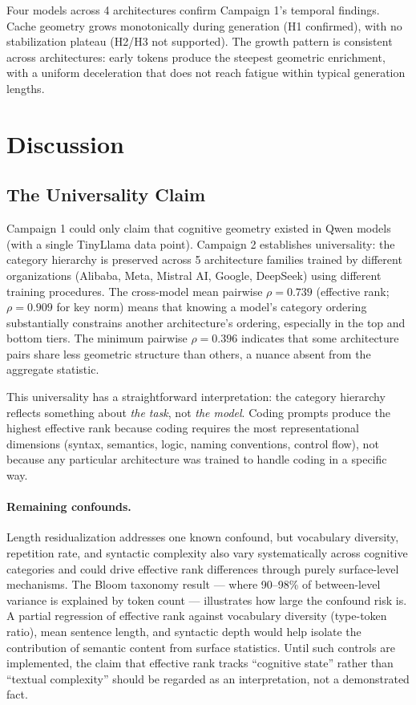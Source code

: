 \documentclass[11pt,a4paper]{article}
\begin{document}
Four models across 4 architectures confirm Campaign 1's temporal findings. Cache geometry grows monotonically during generation (H1 confirmed), with no stabilization plateau (H2/H3 not supported). The growth pattern is consistent across architectures: early tokens produce the steepest geometric enrichment, with a uniform deceleration that does not reach fatigue within typical generation lengths.

\section{Discussion}
\label{sec:discussion}

\subsection{The Universality Claim}

Campaign 1 could only claim that cognitive geometry existed in Qwen models (with a single TinyLlama data point). Campaign 2 establishes universality: the category hierarchy is preserved across 5 architecture families trained by different organizations (Alibaba, Meta, Mistral AI, Google, DeepSeek) using different training procedures. The cross-model mean pairwise $\rho = 0.739$ (effective rank; $\rho = 0.909$ for key norm) means that knowing a model's category ordering substantially constrains another architecture's ordering, especially in the top and bottom tiers. The minimum pairwise $\rho = 0.396$ indicates that some architecture pairs share less geometric structure than others, a nuance absent from the aggregate statistic.

This universality has a straightforward interpretation: the category hierarchy reflects something about \emph{the task}, not \emph{the model}. Coding prompts produce the highest effective rank because coding requires the most representational dimensions (syntax, semantics, logic, naming conventions, control flow), not because any particular architecture was trained to handle coding in a specific way.

\paragraph{Remaining confounds.} Length residualization addresses one known confound, but vocabulary diversity, repetition rate, and syntactic complexity also vary systematically across cognitive categories and could drive effective rank differences through purely surface-level mechanisms. The Bloom taxonomy result --- where 90--98\% of between-level variance is explained by token count --- illustrates how large the confound risk is. A partial regression of effective rank against vocabulary diversity (type-token ratio), mean sentence length, and syntactic depth would help isolate the contribution of semantic content from surface statistics. Until such controls are implemented, the claim that effective rank tracks ``cognitive state'' rather than ``textual complexity'' should be regarded as an interpretation, not a demonstrated fact.
\end{document}
